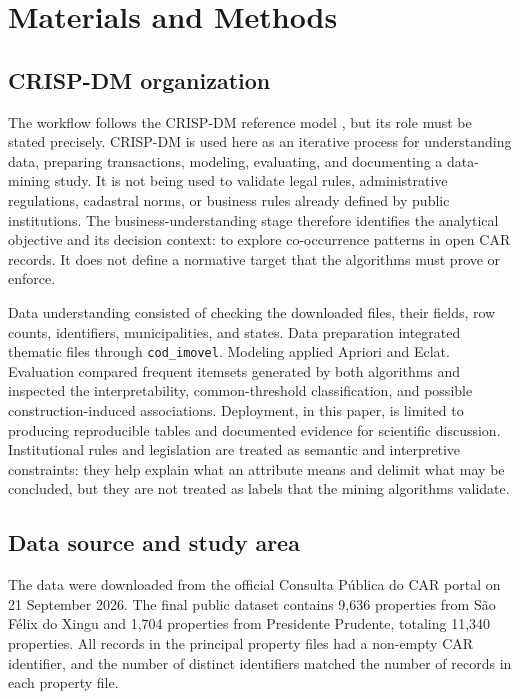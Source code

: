 \documentclass[11pt]{article}
\begin{document}
\section{Materials and Methods}

\subsection{CRISP-DM organization}

The workflow follows the CRISP-DM reference model \citep{chapman2000}, but its role must be stated precisely. CRISP-DM is used here as an iterative process for understanding data, preparing transactions, modeling, evaluating, and documenting a data-mining study. It is not being used to validate legal rules, administrative regulations, cadastral norms, or business rules already defined by public institutions. The business-understanding stage therefore identifies the analytical objective and its decision context: to explore co-occurrence patterns in open CAR records. It does not define a normative target that the algorithms must prove or enforce.

Data understanding consisted of checking the downloaded files, their fields, row counts, identifiers, municipalities, and states. Data preparation integrated thematic files through \texttt{cod\_imovel}. Modeling applied Apriori and Eclat. Evaluation compared frequent itemsets generated by both algorithms and inspected the interpretability, common-threshold classification, and possible construction-induced associations. Deployment, in this paper, is limited to producing reproducible tables and documented evidence for scientific discussion. Institutional rules and legislation are treated as semantic and interpretive constraints: they help explain what an attribute means and delimit what may be concluded, but they are not treated as labels that the mining algorithms validate.

\subsection{Data source and study area}

The data were downloaded from the official Consulta Pública do CAR portal \citep{carportal2026} on 21 September 2026. The final public dataset contains 9,636 properties from São Félix do Xingu and 1,704 properties from Presidente Prudente, totaling 11,340 properties. All records in the principal property files had a non-empty CAR identifier, and the number of distinct identifiers matched the number of records in each property file.
\end{document}
